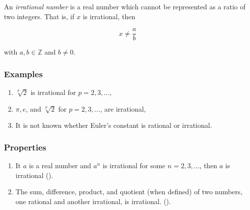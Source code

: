 \documentclass{article}
\begin{document}
An \emph{irrational number} is a real number which cannot be represented as a ratio of two integers.  That is, if $x$ is irrational, then 

$$ x \ne \frac{a}{b} $$

with $a,b \in \mathbb{Z}$ and $b \ne 0$.

\subsubsection*{Examples}
\begin{enumerate}
\item $\sqrt[p]{2}$ is irrational for $p=2,3,\ldots$,
\item $\pi, e$, and $\sqrt[p]{2}$ for $p=2,3,\ldots$,
       are irrational,
\item It is not known whether Euler's constant is rational or irrational.
\end{enumerate}

\subsubsection*{Properties}
\begin{enumerate}
\item It $a$ is a real number and $a^n$ is irrational for some $n=2,3,\ldots$, 
then $a$ is irrational (). 
\item The sum, difference, product, and quotient (when defined) of two numbers,
one rational and another irrational, is irrational. 
(). 
\end{enumerate}
\end{document}
